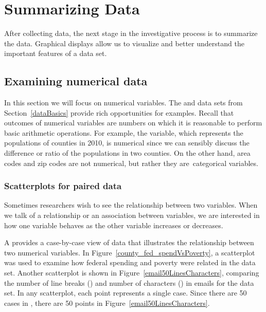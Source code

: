 \chapter{Summarizing Data}
\label{summarizingData}

After collecting data, the next stage in the investigative process is to summarize the data. Graphical displays allow us to visualize and better understand the important features of a data set.

\section{Examining numerical data}
\label{numericalData}
In this section we will focus on numerical variables. The  and  data sets from Section~\ref{dataBasics} provide rich opportunities for examples. Recall that outcomes of numerical variables are numbers on which it is reasonable to perform basic arithmetic operations. For example, the  variable, which represents the populations of counties in 2010, is numerical since we can sensibly discuss the difference or ratio of the populations in two counties. On the other hand, area codes and zip codes are not numerical, but rather they are~categorical variables.


\subsection{Scatterplots for paired data}
\label{scatterPlots}


Sometimes researchers wish to see the relationship between two variables. When we talk of a relationship or an association between variables, we are interested in how one variable behaves as the other variable increases or decreases.

A  provides a case-by-case view of data that illustrates the relationship between two numerical variables. In Figure~\vref{county_fed_spendVsPoverty}, a scatterplot was used to examine how federal spending and poverty were related in the  data set. Another scatterplot is shown in Figure~\ref{email50LinesCharacters}, comparing the number of line breaks () and number of characters () in emails for the  data set. In any scatterplot, each point represents a single case. Since there are 50 cases in , there are 50 points in Figure~\ref{email50LinesCharacters}.

